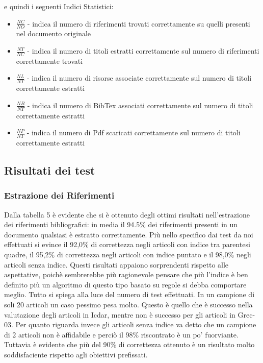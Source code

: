 e quindi i seguenti Indici Statistici:
\begin{itemize}
 \item \textbf{$\frac{NC}{NO}$} - indica il numero di riferimenti trovati correttamente su quelli presenti nel documento originale
 \item \textbf{$\frac{NT}{NC}$} - indica il numero di titoli estratti correttamente sul numero di riferimenti correttamente trovati
 \item \textbf{$\frac{NL}{NT}$} - indica il numero di risorse associate correttamente sul numero di titoli correttamente estratti
 \item \textbf{$\frac{NB}{NT}$} - indica il numero di BibTex associati correttamente sul numero di titoli correttamente estratti
 \item \textbf{$\frac{NP}{NT}$} - indica il numero di Pdf scaricati correttamente sul numero di titoli correttamente estratti
\end{itemize}

\subsection{Risultati dei test}
\subsubsection{Estrazione dei Riferimenti}
Dalla tabella 5 è evidente che si è ottenuto degli ottimi risultati nell'estrazione dei riferimenti bibliografici: in media il 94.5\% dei riferimenti presenti in un documento qualsiasi è estratto correttamente. Più nello specifico dai test da noi effettuati si evince il 92,0\% di correttezza negli articoli con indice tra parentesi quadre, il 95,2\% di correttezza negli articoli con indice puntato e il 98,0\% negli articoli senza indice. Questi risultati appaiono sorprendenti rispetto alle aspettative, poichè sembrerebbe più ragionevole pensare che più l'indice è ben definito più un algoritmo di questo tipo basato su regole si debba comportare meglio. Tutto si spiega alla luce del numero di test effettuati. In un campione di soli 20 articoli un caso pessimo pesa molto. Questo è quello che è successo nella valutazione degli articoli in Icdar, mentre non è successo per gli articoli in Grec-03. Per quanto riguarda invece gli articoli senza indice va detto che un campione di 2 articoli non è affidabile e perciò il 98\% riscontrato è un po' fuorviante. Tuttavia è evidente che più del 90\% di correttezza ottenuto è un risultato molto soddisfaciente rispetto agli obiettivi prefissati. 

